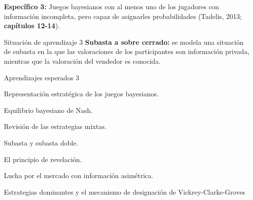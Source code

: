 \documentclass[11pt]{article}
\newenvironment{tight_enumerate}{
	\begin{enumerate}
		\setlength{\itemsep}{0pt}
		\setlength{\parskip}{0pt}
	}{\end{enumerate}}
\begin{document}
\begin{tcolorbox}[colback=bluerow!60]
	\textbf{Específico 3: }
	Juegos bayesianos con al menos uno de los jugadores con información incompleta, pero capaz de asignarles probabilidades (Tadelis, 2013; \textbf{capítulos 12-14}).
	\begin{mybox}[colback=redrow!80]{Situación de aprendizaje 3}
		\textbf{Subasta a sobre cerrado:} se modela una situación de subasta en la que las valoraciones de los participantes son información privada, mientras que la valoración del vendedor es conocida.
	\end{mybox}
	
	\begin{mybox}[colback=purplerow!80]{Aprendizajes esperados 3}
		\begin{tight_enumerate}
			\item Representación estratégica de los juegos bayesianos. 
			\item Equilibrio bayesiano de Nash. 
			\item Revisión de las estrategias mixtas. 
			\item Subasta y subasta doble. 
			\item El principio de revelación. 
			\item Lucha por el mercado con información asimétrica. 
			\item Estrategias dominantes y el mecanismo de designación de Vickrey-Clarke-Groves
		\end{tight_enumerate}
	\end{mybox}
\end{tcolorbox}

\vspace{1em}
\end{document}
